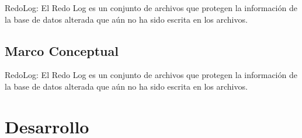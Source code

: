 \documentclass[12pt,letterpaper]{article}
\begin{document}
RedoLog: El Redo Log es un conjunto de archivos que protegen la información de la base de datos alterada que aún no ha sido escrita en los archivos.



\subsection{Marco Conceptual}

\newpage

RedoLog: El Redo Log es un conjunto de archivos que protegen la información de la base de datos alterada que aún no ha sido escrita en los archivos.
\section{Desarrollo}
\end{document}
